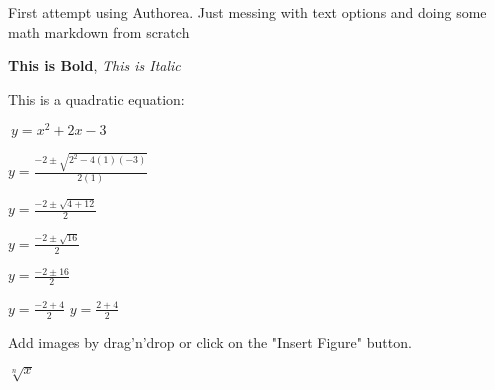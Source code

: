 First attempt using Authorea. Just messing with text options and doing some math markdown from scratch

\textbf{This is Bold}, \textit{This is Italic}

This is a quadratic equation:

$\ y = x^{2} + 2x -3 $


$ y = \frac{-2 \pm \sqrt{2^{2}-4(1)(-3)}}{2(1)}$

$ y = \frac{-2 \pm \sqrt{4+12}}{2}$

$ y = \frac{-2 \pm \sqrt{16}}{2}$

$ y = \frac{-2 \pm {16}}{2}$

$ y = \frac{-2 + {4}}{2}$           $ y = \frac{2 + {4}}{2}$

Add images by drag'n'drop or click on the "Insert Figure" button.

$\sqrt[n]{x}$
